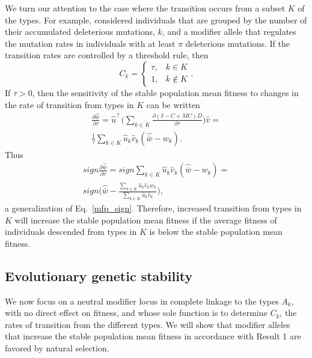 \documentclass[9pt, a4paper, twocolumn]{extarticle}
\newcommand*{\tr}{^\intercal}
\begin{document}
We turn our attention to the case where the transition occurs from a subset $K$ of the types.
For example, \citet[Appendix~B]{Ram2012} considered individuals that are grouped by the number of their accumulated deleterious mutations, $k$, 
and a modifier allele that regulates the mutation rates in individuals with at least $\pi$ deleterious mutations.
If the transition rates are controlled by a threshold rule, then 
\begin{equation}
C_k = \begin{cases}
\tau, & k \in K \\
1, & k \not\in K
\end{cases}.
\end{equation}
If $\tau > 0$, then the sensitivity of the stable population mean fitness to changes in the
rate of transition from types in $K$ can be written 
\begin{equation}
\begin{aligned}
\frac{\partial \hat{\bar w}}{\partial \tau} = 
\hat u\tr \Big( \sum_{k \in K}{\frac{\partial (I - C + MC)D}{\partial \tau}} \Big) \hat v = \\
\frac{1}{\tau} \sum_{k \in K}{\hat u_k \hat v_k (\hat{\bar w} - w_k)}.
\end{aligned}
\end{equation}
Thus
\begin{multline}\label{mfp_sign_threshold}
sign \frac{\partial \hat{\bar w}}{\partial \tau} = 
sign \sum_{k \in K}{\hat u_k \hat v_k (\hat{\bar w} - w_k)} = \\ 
sign \Big(\hat{\bar w} - \frac{\sum_{k \in K}{\hat u_k \hat v_k w_k}}{\sum_{k \in K}{\hat u_k \hat v_k}}\Big), 
\end{multline}
a generalization of Eq.~\ref{mfp_sign}.
Therefore, increased transition from types in $K$ will increase the stable population mean fitness if the average fitness of individuals descended from types in $K$ is below the stable population mean fitness.

\subsection*{Evolutionary genetic stability}

We now focus on a neutral modifier locus in complete linkage to the types $A_k$, with no direct effect on fitness, and whose sole function is to determine $C_k$, the rates of transition from the different types.
We will show that modifier alleles that increase the stable population mean fitness in accordance with Result 1 are favored by natural selection.
\end{document}
